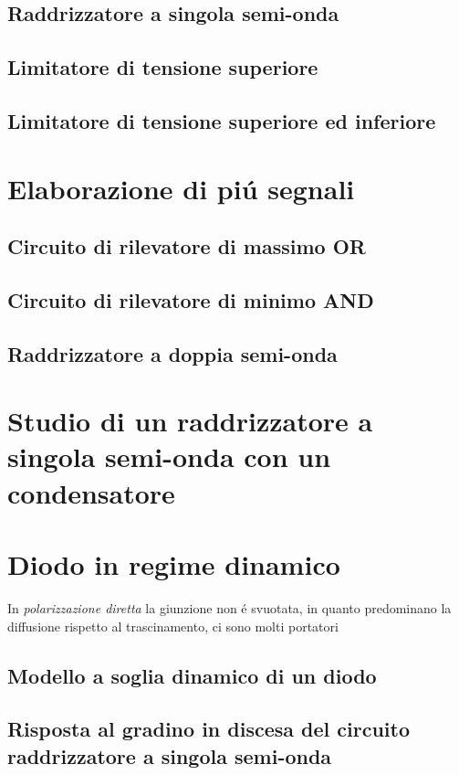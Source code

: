 \documentclass{article}
\begin{document}
\subsection{Raddrizzatore a singola semi-onda}
\subsection{Limitatore di tensione superiore}
\subsection{Limitatore di tensione superiore ed inferiore}
\section{Elaborazione di pi\'u segnali}
\subsection{Circuito di rilevatore di massimo OR}
\subsection{Circuito di rilevatore di minimo AND}
\subsection{Raddrizzatore a doppia semi-onda}
\section{Studio di un raddrizzatore a singola semi-onda con un condensatore}
\section{Diodo in regime dinamico}
In \textit{polarizzazione diretta} la giunzione non \'e svuotata, in quanto predominano la diffusione rispetto al trascinamento, ci sono molti portatori

\subsection{Modello a soglia dinamico di un diodo}
\subsection{Risposta al gradino in discesa del circuito raddrizzatore a singola semi-onda}
\end{document}
